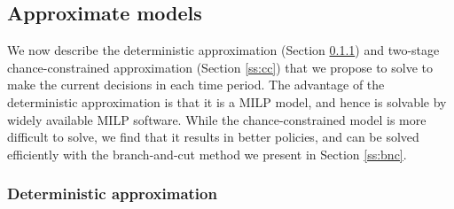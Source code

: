 \documentclass[msom]{oo}
\begin{document}


\subsection{Approximate models} 
\label{ss:approx}
We now describe the deterministic approximation (Section \ref{ss:det}) and two-stage chance-constrained approximation (Section \ref{ss:cc}) that we propose to solve to make the current decisions in each time period.
The advantage of the deterministic approximation is that it is a MILP model, and hence is solvable by widely available MILP software. While the chance-constrained model is more difficult to solve, we find that it results in better policies, and can be solved efficiently with the branch-and-cut method we present in Section \ref{ss:bnc}.


  
\subsubsection{Deterministic approximation}
\label{ss:det}
\end{document}
